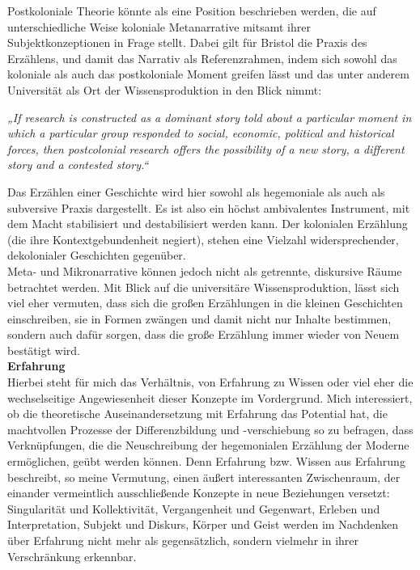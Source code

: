 Postkoloniale Theorie könnte als eine Position beschrieben werden, die  auf
unterschiedliche Weise  koloniale Metanarrative mitsamt ihrer
Subjektkonzeptionen in Frage stellt. Dabei gilt für Bristol die Praxis des
Erzählens, und damit das Narrativ als Referenzrahmen, indem sich sowohl das
koloniale als auch das postkoloniale Moment greifen lässt und das unter anderem
Universität als Ort der Wissensproduktion in den Blick nimmt:
\begin{myenv} \textit{  „If research is constructed as a dominant story told
    about a particular moment in which a particular group responded to social,
    economic, political and historical forces, then postcolonial research
    offers the possibility of a new story, a different story and a contested
story.“\footnotemark {} } \end{myenv}
Das Erzählen einer Geschichte wird hier sowohl als hegemoniale als auch als
subversive Praxis dargestellt. Es ist also ein höchst ambivalentes Instrument,
mit dem Macht stabilisiert und destabilisiert werden kann. Der kolonialen
Erzählung (die ihre Kontextgebundenheit negiert), stehen eine Vielzahl
widersprechender, dekolonialer Geschichten gegenüber.\\

Meta- und Mikronarrative können jedoch nicht als getrennte, diskursive Räume
betrachtet werden. Mit Blick auf die universitäre Wissensproduktion, lässt sich
viel eher vermuten, dass sich die großen Erzählungen in die kleinen Geschichten
einschreiben, sie in Formen zwängen und damit nicht nur Inhalte bestimmen,
sondern auch dafür sorgen, dass die große Erzählung immer wieder von Neuem
bestätigt wird.\\

\textbf{\large Erfahrung}\\
Hierbei steht für mich das Verhältnis, von Erfahrung zu Wissen oder viel eher
die wechselseitige Angewiesenheit dieser Konzepte im Vordergrund. Mich
interessiert, ob die theoretische Auseinandersetzung mit Erfahrung das
Potential hat, die machtvollen Prozesse der Differenzbildung und -verschiebung
so zu befragen, dass Verknüpfungen, die die Neuschreibung der hegemonialen
Erzählung der Moderne ermöglichen, geübt werden können. Denn Erfahrung bzw.
Wissen aus Erfahrung beschreibt, so meine Vermutung, einen äußert interessanten
Zwischenraum, der einander vermeintlich ausschließende Konzepte in neue
Beziehungen versetzt: \\
Singularität und Kollektivität, Vergangenheit und
Gegenwart, Erleben und Interpretation, Subjekt und Diskurs, Körper und Geist
werden im Nachdenken über Erfahrung nicht mehr als gegensätzlich, sondern
vielmehr in ihrer Verschränkung erkennbar.\\

